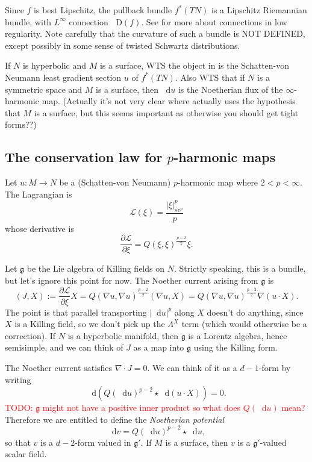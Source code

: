 \documentclass[reqno,11pt]{amsart}
\newcommand*\dif{\mathop{}\!\mathrm{d}}
\newcommand*\Dif{\mathop{}\!\mathrm{D}}
\newcommand{\Lagrange}{\mathscr L}
\newcommand{\frkg}{\mathfrak g}
\newcommand{\dfn}[1]{\emph{#1}\index{#1}}
\theoremstyle{definition}
\numberwithin{equation}{section}
\newcommand\todo[1]{\textcolor{red}{TODO: #1}}
\begin{document}
Since $f$ is best Lipschitz, the pullback bundle $f^*(TN)$ is a Lipschitz Riemannian bundle, with $L^\infty$ connection $\Dif(f)$.
See \cite{Oh_2018} for more about connections in low regularity.
Note carefully that the curvature of such a bundle is NOT DEFINED, except possibly in some sense of twisted Schwartz distributions.

If $N$ is hyperbolic and $M$ is a surface, WTS the object in \cite[Theorem 3.13]{daskalopoulos2022analytic} is the Schatten-von Neumann least gradient section $u$ of $f^*(TN)$.
Also WTS that if $N$ is a symmetric space and $M$ is a surface, then $\dif u$ is the Noetherian flux of the $\infty$-harmonic map.
(Actually it's not very clear where \cite{daskalopoulos2022analytic} actually uses the hypothesis that $M$ is a surface, but this seems important as otherwise you should get tight forms??)

\subsection{The conservation law for \texorpdfstring{$p$-harmonic}{p-harmonic} maps}
Let $u: M \to N$ be a (Schatten-von Neumann) $p$-harmonic map where $2 < p < \infty$.
The Lagrangian is 
$$\Lagrange(\xi) = \frac{|\xi|_{sv^p}^p}{p}$$
whose derivative is 
$$\frac{\partial \Lagrange}{\partial \xi} = Q(\xi, \xi)^{\frac{p - 2}{2}} \xi.$$

Let $\frkg$ be the Lie algebra of Killing fields on $N$. Strictly speaking, this is a bundle, but let's ignore this point for now.
The Noether current arising from $\frkg$ is 
$$(J, X) := \frac{\partial \Lagrange}{\partial \xi} X = Q(\nabla u, \nabla u)^{\frac{p - 2}{2}} (\nabla u, X) = Q(\nabla u, \nabla u)^{\frac{p - 2}{2}} \nabla (u \cdot X).$$
The point is that parallel transporting $|\dif u|^p$ along $X$ doesn't do anything, since $X$ is a Killing field, so we don't pick up the $\Lambda^X$ term (which would otherwise be a correction).
If $N$ is a hyperbolic manifold, then $\frkg$ is a Lorentz algebra, hence semisimple, and we can think of $J$ as a map into $\frkg$ using the Killing form.

The Noether current satisfies $\nabla \cdot J = 0$.
We can think of it as a $d - 1$-form by writing 
$$\dif\left(Q(\dif u)^{p - 2} \star \dif(u \cdot X)\right) = 0.$$
\todo{$\frkg$ might not have a positive inner product so what does $Q(\dif u)$ mean?}
Therefore we are entitled to define the \dfn{Noetherian potential}
$$\dif v = Q(\dif u)^{p - 2} \star \dif u,$$
so that $v$ is a $d - 2$-form valued in $\frkg'$.
If $M$ is a surface, then $v$ is a $\frkg'$-valued scalar field.
\end{document}
